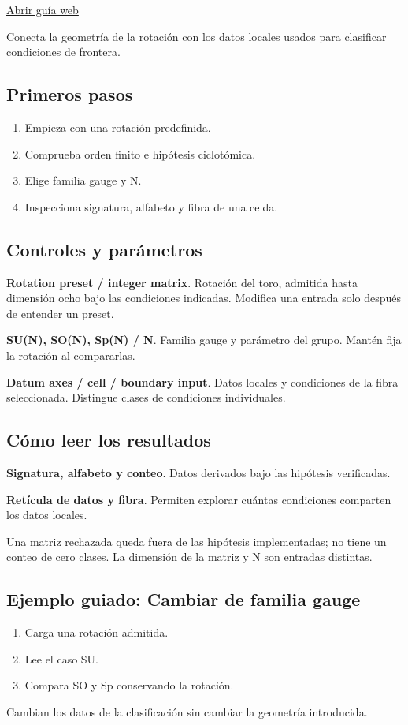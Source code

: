 \documentclass[11pt,a4paper]{article}
\begin{document}
\href{https://karlesmarin.github.io/ghu-explorer/guide/es/orbifold/index.html}{Abrir guía web}

Conecta la geometría de la rotación con los datos locales usados para clasificar condiciones de frontera.
\subsection*{Primeros pasos}
\begin{enumerate}
\item Empieza con una rotación predefinida.
\item Comprueba orden finito e hipótesis ciclotómica.
\item Elige familia gauge y N.
\item Inspecciona signatura, alfabeto y fibra de una celda.
\end{enumerate}
\subsection*{Controles y parámetros}
\textbf{Rotation preset / integer matrix}. Rotación del toro, admitida hasta dimensión ocho bajo las condiciones indicadas. Modifica una entrada solo después de entender un preset.

\textbf{SU(N), SO(N), Sp(N) / N}. Familia gauge y parámetro del grupo. Mantén fija la rotación al compararlas.

\textbf{Datum axes / cell / boundary input}. Datos locales y condiciones de la fibra seleccionada. Distingue clases de condiciones individuales.

\subsection*{Cómo leer los resultados}
\textbf{Signatura, alfabeto y conteo}. Datos derivados bajo las hipótesis verificadas.

\textbf{Retícula de datos y fibra}. Permiten explorar cuántas condiciones comparten los datos locales.

Una matriz rechazada queda fuera de las hipótesis implementadas; no tiene un conteo de cero clases. La dimensión de la matriz y N son entradas distintas.
\subsection*{Ejemplo guiado: Cambiar de familia gauge}
\begin{enumerate}
\item Carga una rotación admitida.
\item Lee el caso SU.
\item Compara SO y Sp conservando la rotación.
\end{enumerate}
Cambian los datos de la clasificación sin cambiar la geometría introducida.
\end{document}
